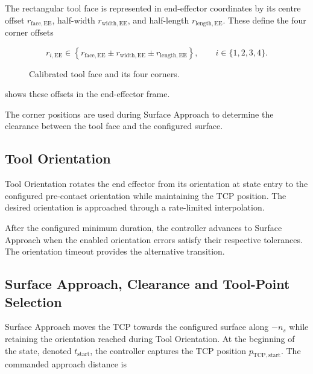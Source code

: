The rectangular tool face is represented in end-effector coordinates by its
centre offset \mbox{\(r_{\mathrm{face,EE}}\)}, half-width
\mbox{\(r_{\mathrm{width,EE}}\)}, and half-length
\mbox{\(r_{\mathrm{length,EE}}\)}. These define the four corner offsets

\begin{equation}
r_{i,\mathrm{EE}}\in
\left\{
r_{\mathrm{face,EE}}
\mathbin{\pm}r_{\mathrm{width,EE}}
\mathbin{\pm}r_{\mathrm{length,EE}}
\right\},
\qquad
i\in\{1,2,3,4\}.
\label{eq:implementation_tool_face_vertices}
\end{equation}

\begin{figure}[H]
  \centering
  
  \caption{Calibrated tool face and its four corners.}
  \label{fig:face_feature_selection}
\end{figure}

\mbox{} shows these offsets in the
end-effector frame.

The corner positions are used during Surface Approach to determine the
clearance between the tool face and the configured surface.


\subsection{Tool Orientation}
\label{subsec:implementation_tool_orientation_phase}

Tool Orientation rotates the end effector from its orientation at state entry
to the configured pre-contact orientation while maintaining the TCP position.
The desired orientation is approached through a rate-limited interpolation.

After the configured minimum duration, the controller advances to Surface
Approach when the enabled orientation errors satisfy their respective
tolerances. The orientation timeout provides the alternative transition.


\subsection{Surface Approach, Clearance and Tool-Point Selection}
\label{subsec:implementation_surface_approach_phase}
\label{subsec:implementation_clearance_detection}

Surface Approach moves the TCP towards the configured surface along
\mbox{\(-n_s\)} while retaining the orientation reached during Tool
Orientation. At the beginning of the state, denoted
\mbox{\(t_{\mathrm{start}}\)}, the controller captures the TCP position
\mbox{\(p_{\mathrm{TCP,start}}\)}. The commanded approach distance is


